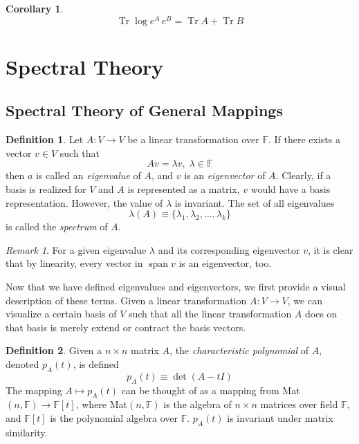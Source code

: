 \documentclass{article}
\DeclareMathOperator{\Tr}{Tr}
\DeclareMathOperator{\Span}{span}
\newtheorem{corollary}{Corollary}[theorem]
\theoremstyle{remark}
\newtheorem*{remark}{Remark}
\theoremstyle{definition}
\newtheorem{definition}{Definition}[section]
\begin{document}
    \begin{corollary}
    \[\Tr{\log{e^A \, e^B}} = \Tr{A} + \Tr{B}\]
    \end{corollary}

\section{Spectral Theory} 

  \subsection{Spectral Theory of General Mappings}

    \begin{definition}
    Let $A: V \longrightarrow V$ be a linear transformation over $\mathbb{F}$. If there exists a vector $v \in V$ such that
    \[ A v = \lambda v, \; \lambda \in \mathbb{F}\]
    then $a$ is called an \textit{eigenvalue} of $A$, and $v$ is an \textit{eigenvector} of $A$. Clearly, if a basis is realized for $V$ and $A$ is represented as a matrix, $v$ would have a basis representation. However, the value of $\lambda$ is invariant. The set of all eigenvalues 
    \[\lambda(A) \equiv \{ \lambda_1, \lambda_2, ..., \lambda_k\}\]
    is called the \textit{spectrum} of $A$. 
    \end{definition}

    \begin{remark}
    For a given eigenvalue $\lambda$ and its corresponding eigenvector $v$, it is clear that by linearity, every vector in $\Span v$ is an eigenvector, too. 
    \end{remark}

    Now that we have defined eigenvalues and eigenvectors, we first provide a visual description of these terms. Given a linear transformation $A: V \longrightarrow V$, we can visualize a certain basis of $V$ such that all the linear transformation $A$ does on that basis is merely extend or contract the basis vectors.

    \begin{definition}
    Given a $n \times n$ matrix $A$, the \textit{characteristic polynomial} of $A$, denoted $p_A (t)$, is defined
    \[ p_A (t) \equiv \det{(A - t I)}\]
    The mapping $A \mapsto p_A (t)$ can be thought of as a mapping from Mat$(n, \mathbb{F}) \longrightarrow \mathbb{F}[t]$, where Mat$(n, \mathbb{F})$ is the algebra of $n \times n$ matrices over field $\mathbb{F}$, and $\mathbb{F}[t]$ is the polynomial algebra over $\mathbb{F}$. $p_A (t)$ is invariant under matrix similarity. 
    \end{definition}
\end{document}
